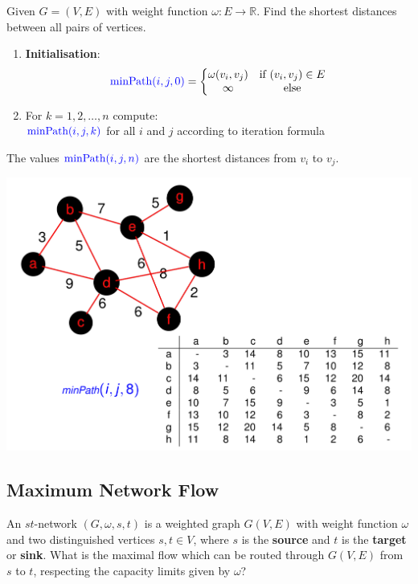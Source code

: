 \documentclass[11pt]{article}
\begin{document}
Given $G=(V,E)$ with weight function $\omega : E \rightarrow \mathbb{R}$. Find the shortest distances between all pairs of vertices.

\begin{enumerate}
	\item \textbf{Initialisation}:
	\begin{equation*}
		{\color{Blue1}\text{minPath}(i,j,0)} = \left\{ \begin{matrix}
		\omega(v_i,v_j) & \text{if } (v_i,v_j) \in E\\
		\infty & \text{else}
		\end{matrix} \right.
	\end{equation*}
	\item For $k=1,2,\dots,n$ compute:\\
	${\color{Blue1}\text{minPath}(i,j,k)}$ for all $i$ and $j$ according to iteration formula
\end{enumerate}

The values ${\color{Blue1}\text{minPath}(i,j,n)}$ are the shortest distances from $v_i$ to $v_j$.

\begin{center}
	\includegraphics[width=0.7\linewidth]{img/floyd_warshall_algorithm_example}
\end{center}

\subsection{Maximum Network Flow}
An $st$-network $(G,\omega,s,t)$ is a weighted graph $G(V,E)$ with weight function $\omega$ and two distinguished vertices $s,t \in V$, where $s$ is the \textbf{source} and $t$ is the \textbf{target} or \textbf{sink}. What is the maximal flow which can be routed through $G(V,E)$ from $s$ to $t$, respecting the capacity limits given by $\omega$?
\end{document}
